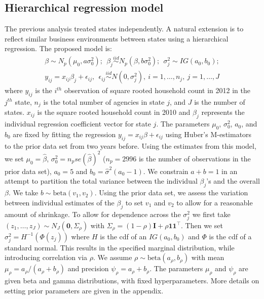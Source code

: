 \documentclass[ba]{imsart}
\newcommand{\mb}{\mathbf}
\newcommand{\iid}{\stackrel{iid}{\sim}}
\begin{document}
\subsection{Hierarchical regression model}
\label{hierRegNW}
The previous analysis treated states independently. A natural extension is to  reflect similar business environments between states using a hierarchical regression. The proposed model is:
\begin{align}
\label{eq:hierModel}
&\beta\sim N_p(\mu_0, a\sigma_0^{2});\ \ 
\beta_j\iid N_p(\beta, b\sigma_0^{2}); \ \  
\sigma_j^2\sim IG(a_0,b_0);  & \\ \nonumber
& y_{ij}=x_{ij}\beta_j+\epsilon_{ij},\ \ \epsilon_{ij}\iid N(0, \sigma_j^2),\ i=1,\dots, n_j,\ j=1,\dots, J &
\end{align}
where $y_{ij}$ is the $i^{th}$ observation of square rooted household count in 2012 in the $j^{th}$
state, $n_{j}$ is the total number of agencies in state $j$, and $J$ is
the number of states. $x_{ij}$ is the square rooted household count in 2010 and $\beta_j$ represents the individual regression coefficient vector for state $j$. The parameters $\mu_0$,
$\sigma^{2}_0$, $a_0$, and $b_0$ are fixed by fitting  the regression $y_{ij}=x_{ij}\beta+\epsilon_{ij}$ using Huber's M-estimators to the prior data set from two years before. Using the estimates from this model, we set $\mu_{0} = \hat\beta$, $\sigma_{0}^{2} = n_{p}se(\hat\beta)^{2}$ ($n_{p} = 2996$ is the number of observations in the prior data set), $a_{0}=5$ and $b_{0} = \hat\sigma^{2}(a_{0} -1)$. We constrain $a+b=1$
in an attempt to partition the total variance between the individual
$\beta_j$'s and the overall $\beta$. We take $b\sim
\text{beta}(v_1,v_2)$. Using the prior data set, we assess the
variation between individual estimates of the $\beta_j$ to set $v_1$
and $v_2$ to allow for a reasonable amount of shrinkage. To allow for
dependence across the $\sigma_j^2$ we first take
$(z_1,\dots,z_J)\sim N_J(\mathbf{0}, \Sigma_\rho)$ with
$\Sigma_\rho=(1-\rho)\mb{I}+\rho \mb{1}\mb{1}^{\top}$. Then we set
$\sigma^2_j=H^{-1}(\Phi(z_j))$ where $H$ is the cdf of an
$IG(a_0,b_0)$ and $\Phi$ is the cdf of a standard normal. This results in the specified marginal distribution, while
introducing correlation via $\rho$. We assume $\rho\sim
\text{beta}(a_\rho,b_\rho)$ with mean $\mu_\rho=a_\rho/(a_\rho+b_\rho)$ and precision
$\psi_\rho=a_\rho+b_\rho$. The parameters $\mu_\rho$ and
$\psi_{\rho}$  are given beta and gamma distributions, with fixed hyperparameters. More details on setting prior parameters are given in the appendix. 
\end{document}
